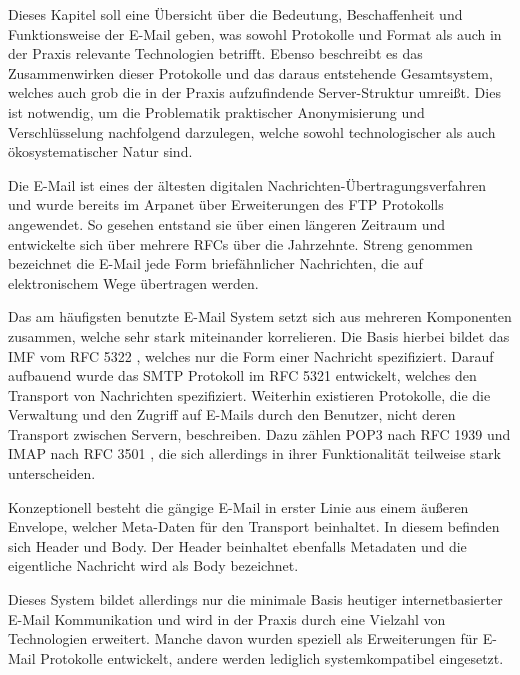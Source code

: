 Dieses Kapitel soll eine Übersicht über die Bedeutung, Beschaffenheit und Funktionsweise der E-Mail geben, was sowohl Protokolle und Format als auch in der Praxis relevante Technologien betrifft. Ebenso beschreibt es das Zusammenwirken dieser Protokolle und das daraus entstehende Gesamtsystem, welches auch grob die in der Praxis aufzufindende Server-Struktur umreißt. Dies ist notwendig, um die Problematik praktischer Anonymisierung und Verschlüsselung nachfolgend darzulegen, welche sowohl technologischer als auch ökosystematischer Natur sind.

Die E-Mail ist eines der ältesten digitalen Nachrichten-Übertragungsverfahren und wurde bereits im Arpanet über Erweiterungen des FTP Protokolls  
angewendet. So gesehen entstand sie über einen längeren Zeitraum und entwickelte sich über mehrere RFCs über die Jahrzehnte.
Streng genommen bezeichnet die E-Mail jede Form briefähnlicher Nachrichten, die auf elektronischem Wege übertragen werden.

Das am häufigsten benutzte E-Mail System
setzt sich aus mehreren Komponenten zusammen, welche sehr stark miteinander korrelieren.
Die Basis hierbei bildet das IMF vom RFC 5322 ,
welches nur die Form einer Nachricht spezifiziert. Darauf aufbauend wurde das SMTP Protokoll im RFC 5321 
entwickelt, welches den Transport von Nachrichten spezifiziert. Weiterhin existieren Protokolle, die die Verwaltung und den Zugriff auf E-Mails durch den Benutzer, nicht deren Transport zwischen Servern, beschreiben. Dazu zählen POP3 nach RFC 1939 
und IMAP nach RFC 3501 ,
die sich allerdings in ihrer Funktionalität teilweise stark unterscheiden.

Konzeptionell besteht die gängige E-Mail in erster Linie aus einem äußeren Envelope, welcher Meta-Daten für den Transport beinhaltet. In diesem befinden sich Header und Body. Der Header beinhaltet ebenfalls Metadaten und die eigentliche Nachricht wird als Body bezeichnet.

Dieses System bildet allerdings nur die minimale Basis heutiger internetbasierter E-Mail Kommunikation und wird in der Praxis durch eine Vielzahl von Technologien erweitert. Manche davon wurden speziell als Erweiterungen für E-Mail Protokolle entwickelt, andere werden lediglich systemkompatibel eingesetzt.

